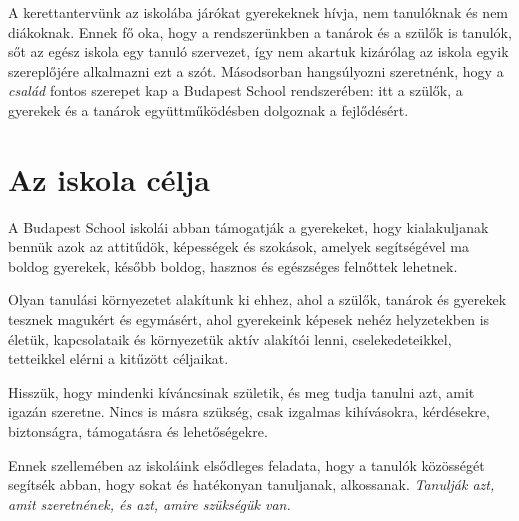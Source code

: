 A kerettantervünk az iskolába járókat gyerekeknek hívja, nem tanulóknak és nem diákoknak. Ennek fő oka, hogy a rendszerünkben a tanárok és a szülők is tanulók, sőt az egész iskola egy tanuló szervezet, így nem akartuk  kizárólag az iskola egyik szereplőjére alkalmazni ezt a szót. Másodsorban hangsúlyozni szeretnénk, hogy a \emph{család} fontos szerepet kap a Budapest School rendszerében: itt a szülők, a gyerekek és a tanárok együttműködésben dolgoznak a fejlődésért.

\section{Az iskola célja}

A Budapest School iskolái abban támogatják a gyerekeket, hogy kialakuljanak bennük azok az attitűdök, képességek és szokások, amelyek segítségével ma boldog gyerekek, később boldog, hasznos és egészséges felnőttek lehetnek.

Olyan tanulási környezetet alakítunk ki ehhez, ahol a szülők, tanárok és gyerekek tesznek magukért és egymásért, ahol gyerekeink képesek nehéz helyzetekben is életük, kapcsolataik és környezetük aktív alakítói lenni, cselekedeteikkel, tetteikkel elérni a kitűzött céljaikat.

Hisszük, hogy mindenki kíváncsinak születik, és meg tudja tanulni azt, amit igazán szeretne. Nincs is másra szükség, csak izgalmas kihívásokra, kérdésekre, biztonságra, támogatásra és lehetőségekre.

Ennek szellemében az iskoláink elsődleges feladata, hogy a tanulók közösségét segítsék abban, hogy sokat és hatékonyan tanuljanak, alkossanak. \emph{Tanulják azt, amit szeretnének, és azt, amire szükségük van.}
